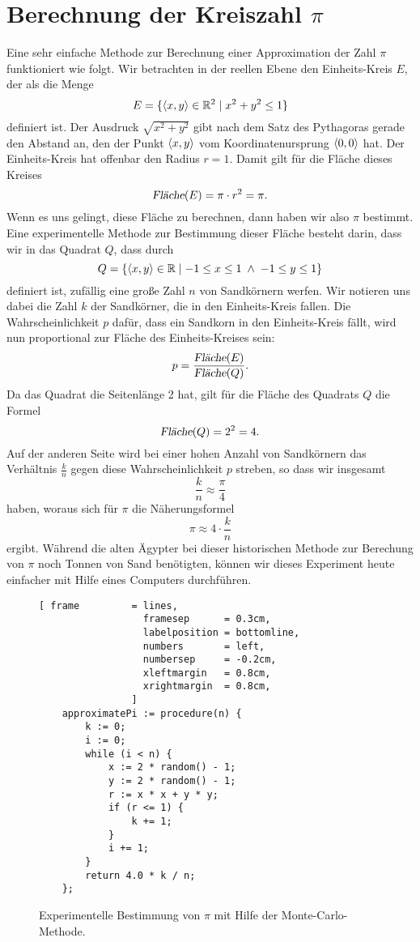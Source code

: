 \section[Computing $\pi$]{Berechnung der Kreiszahl $\pi$}
Eine sehr einfache Methode zur Berechnung einer Approximation der Zahl $\pi$ funktioniert wie folgt.
Wir betrachten in der reellen Ebene den Einheits-Kreis $E$, der als die Menge
\[ E = \{ \pair(x,y) \in \mathbb{R}^2 \mid x^2 + y^2 \leq 1 \} \]
definiert ist.  Der Ausdruck $\sqrt{x^2 + y^2}$ gibt nach dem Satz des Pythagoras gerade den Abstand an,
den der Punkt $\pair(x,y)$ vom Koordinatenursprung $\pair(0,0)$ hat.  Der Einheits-Kreis hat offenbar den
Radius $r = 1$.  Damit gilt f\"ur die Fl\"ache dieses Kreises
\[ \textsl{Fl\"ache}(E) = \pi \cdot r^2 = \pi. \]
Wenn es uns gelingt, diese Fl\"ache zu berechnen, dann haben wir also $\pi$ bestimmt.  Eine experimentelle
Methode zur Bestimmung dieser Fl\"ache besteht darin, dass wir in das Quadrat $Q$, dass durch
\[ Q = \{ \pair(x,y) \in \mathbb{R} \mid -1 \leq x \leq 1 \;\wedge\; -1 \leq y \leq 1 \} \]
definiert ist, zuf\"allig eine gro\ss{}e Zahl $n$ von Sandk\"ornern werfen.  Wir notieren uns dabei die Zahl $k$ 
der Sandk\"orner, die in den Einheits-Kreis fallen.  Die Wahrscheinlichkeit $p$ daf\"ur, dass ein Sandkorn in den
Einheits-Kreis f\"allt, wird nun proportional zur Fl\"ache des Einheits-Kreises sein:
\[ p = \frac{\textsl{Fl\"ache}(E)}{\textsl{Fl\"ache}(Q)}. \]
Da das Quadrat die Seitenl\"ange 2 hat, gilt f\"ur die Fl\"ache des Quadrats $Q$ die Formel
\[ \textsl{Fl\"ache}(Q) = 2^2 = 4. \]
Auf der anderen Seite wird bei einer hohen Anzahl von Sandk\"ornern das Verh\"altnis $\frac{k}{n}$ gegen diese
Wahrscheinlichkeit $p$ streben, so dass wir insgesamt
\[ \frac{k}{n} \approx \frac{\pi}{4} \]
haben, woraus sich f\"ur $\pi$ die N\"aherungsformel
\[ \pi \approx 4 \cdot \frac{k}{n} \]
ergibt.  W\"ahrend die alten \"Agypter bei dieser historischen Methode zur Berechung von $\pi$ noch Tonnen von
Sand ben\"otigten,  k\"onnen wir dieses Experiment heute einfacher mit Hilfe eines Computers durchf\"uhren.

\begin{figure}[!ht]
\centering
\begin{Verbatim}[ frame         = lines, 
                  framesep      = 0.3cm, 
                  labelposition = bottomline,
                  numbers       = left,
                  numbersep     = -0.2cm,
                  xleftmargin   = 0.8cm,
                  xrightmargin  = 0.8cm,
                ]
    approximatePi := procedure(n) {
        k := 0;  
        i := 0;
        while (i < n) {
            x := 2 * random() - 1;
            y := 2 * random() - 1;
            r := x * x + y * y;
            if (r <= 1) {
                k += 1;
            }
            i += 1;
        }
        return 4.0 * k / n;
    };
\end{Verbatim}
\vspace*{-0.3cm}
\caption{Experimentelle Bestimmung von $\pi$ mit Hilfe der Monte-Carlo-Methode.}
\label{fig:monte-carlo.stlx}
\end{figure}

